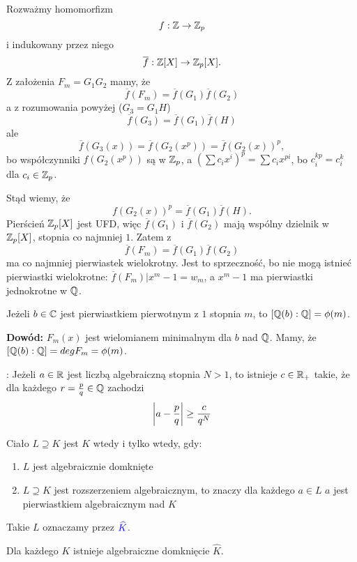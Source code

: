 Rozważmy homomorfizm
$$f:\Z\to\Z_p$$
i indukowany przez niego
$$\overline f:\Z[X]\to\Z_p[X].$$
Z założenia $F_m=G_1G_2$ mamy, że
$$\overline f(F_m)=\overline f(G_1)\overline f(G_2)$$
a z rozumowania powyżej ($G_3=G_1H$)
$$\overline f(G_3)=\overline f(G_1)\overline f(H)$$
ale
$$\overline f(G_3(x))=\overline f(G_2(x^p))=\overline f(G_2(x))^p,$$
bo współczynniki $f(G_2(x^p))$ są w $\Z_p$, a $(\sum c_ix^i)^p=\sum c_ix^{pi}$, bo $c_i^{kp}=c_i^k$ dla $c_i\in\Z_p$.

Stąd wiemy, że
$$f(G_2(x))^p=\overline f(G_1)\overline f(H).$$
Pierścień $\Z_p[X]$ jest UFD, więc $\overline f(G_1)$ i $\overline f(G_2)$ mają wspólny dzielnik w $\Z_p[X]$, stopnia co najmniej $1$. Zatem z
$$\overline f(F_m)=\overline f(G_1)\overline f(G_2)$$
ma co najmniej pierwiastek wielokrotny. Jest to sprzeczność, bo nie mogą istnieć pierwiastki wielokrotne: $\overline f(F_m)|x^m-1=w_m$, a $x^m-1$ ma pierwiastki jednokrotne w $\Q$.

\begin{wniosek}
    Jeżeli $b\in\C$ jest pierwiastkiem pierwotnym z $1$ stopnia $m$, to $[\Q(b):\Q]=\phi(m)$.
\end{wniosek}

\textbf{Dowód:} $F_m(x)$ jest wielomianem minimalnym dla $b$ nad $\Q$. Mamy, że $[\Q(b):\Q]=deg F_m=\phi(m)$.

\begin{lemat} : Jeżeli $a\in\R$ jest liczbą algebraiczną stopnia $N>1$, to istnieje $c\in\R_+$ takie, że dla każdego $r=\frac pq\in\Q$ zachodzi
    $$\left|a-\frac pq\right|\geq{c\over q^N}$$
\end{lemat}

\begin{definicja}
    Ciało $L\supseteq K$ jest  $K$ wtedy i tylko wtedy, gdy:
    \begin{enumerate}
        \item $L$ jest algebraicznie domknięte
        \item $L\supseteq K$ jest rozszerzeniem algebraicznym, to znaczy dla każdego $a\in L$ $a$ jest pierwiastkiem algebraicznym nad $K$
    \end{enumerate}
    Takie $L$ oznaczamy przez $\color{blue}\hat{K}$.
\end{definicja}

\begin{wniosek}
    Dla każdego $K$ istnieje algebraiczne domknięcie $\hat{K}$.
\end{wniosek}

